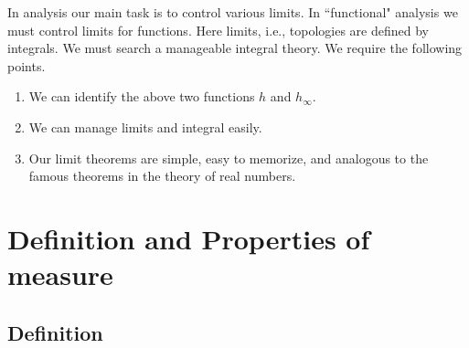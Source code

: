 \documentclass[openany, a4paper, oneside]{jsbook}
\begin{document}
In analysis our main task is to control various limits.
In ``functional" analysis we must control limits for functions.
Here limits, i.e., topologies are defined by integrals.
We must search a manageable integral theory.
We require the following points.
\begin{enumerate}
\item We can identify the above two functions $h$ and $h_{\infty}$.
\item We can manage limits and integral easily.
\item Our limit theorems are simple, easy to memorize, and analogous to the famous theorems in the theory of real numbers.
\end{enumerate}
\section{Definition and Properties of measure}

\subsection{Definition}
\end{document}
